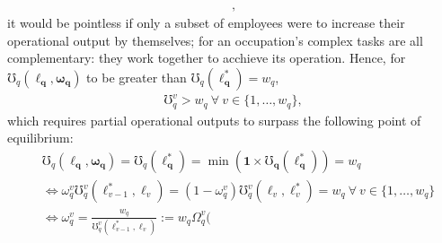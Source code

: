 \documentclass[hidelinks, nonatbib]{elsarticle}
\begin{document}
\begin{enumerate}
\begin{gather}
        ,
    \end{gather}
    it would be pointless if only a subset of employees were to increase their operational output by themselves; for an occupation's complex tasks are all complementary: they work together to acchieve its operation. Hence, for $\mho_{q}(
        \boldsymbol{\ell_q}
        ,\boldsymbol{\omega_q}
    )$ to be greater than $
    \mho_{q}(
        \boldsymbol{\ell_{q}^{*}}
    )
    =
    w_q$,
    \begin{gather}
        \mho_{q}^{v} > w_q
        \
        \forall
        \
        v \in \{1, \dots, w_q\}
        ,
    \end{gather}
    which requires partial operational outputs to surpass the following point of equilibrium:
    \begin{align}
        &\mho_{q}(
            \boldsymbol{\ell_q}
            ,\boldsymbol{\omega_q}
        ) 
        =
        \mho_{q}(
            \boldsymbol{\ell_{q}^{*}}
        ) 
        = 
        \min(
            \boldsymbol{1}
            \times
            \boldsymbol{\mho_q}(
                \boldsymbol{\ell_{q}^{*}}
            )
        )
        =
        w_q
        \\
        &\iff
        \omega_{q}^{v}
        \mho_{q}^{v}(
            \ell_{v-1}^{*}
            ,\ell_{v}
        )
        =
        (1-\omega_{q}^{v})
        \mho_{q}^{v}(
            \ell_{v}
            ,\ell_{v}^{*}
        )
        =
        w_q
        \
        \forall
        \
        v \in \{1, \dots, w_q\}
        \\
        &\iff
        \omega_{q}^{v}
        =
        \frac{w_q}{
            \mho_{q}^{v}(
                \ell_{v-1}^{*}
                ,\ell_{v}
            )
        }
        :=
        w_q
        \Omega_{q}^{v}(

\end{align}
\end{enumerate}
\end{document}
